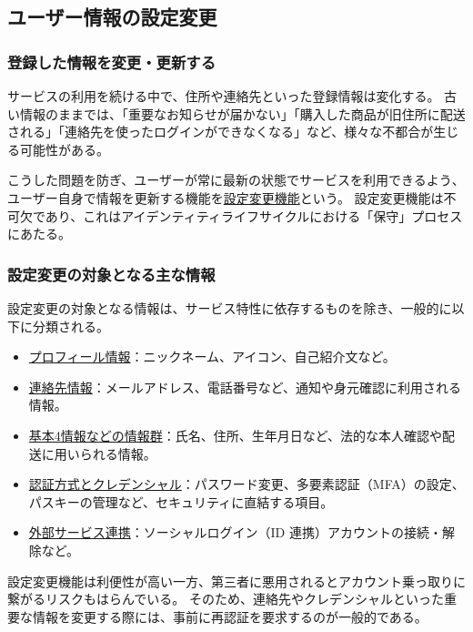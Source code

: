 \documentclass[uplatex]{jsarticle}
\def\label#1{}%
\begin{document}
\subsection{ユーザー情報の設定変更}

\subsubsection{登録した情報を変更・更新する}

サービスの利用を続ける中で、住所や連絡先といった登録情報は変化する。
古い情報のままでは、「重要なお知らせが届かない」「購入した商品が旧住所に配送される」「連絡先を使ったログインができなくなる」など、様々な不都合が生じる可能性がある。

\begin{dfn}[ユーザー情報の設定変更]\label{dfn:ch3-settings-change}
こうした問題を防ぎ、ユーザーが常に最新の状態でサービスを利用できるよう、ユーザー自身で情報を更新する機能を\underline{設定変更機能}という。
設定変更機能は不可欠であり、これはアイデンティティライフサイクルにおける「保守」プロセスにあたる。
\end{dfn}

\subsubsection{設定変更の対象となる主な情報}

設定変更の対象となる情報は、サービス特性に依存するものを除き、一般的に以下に分類される。
\begin{itemize}
\item \underline{プロフィール情報}：ニックネーム、アイコン、自己紹介文など。
\item \underline{連絡先情報}：メールアドレス、電話番号など、通知や身元確認に利用される情報。
\item \underline{基本4情報などの情報群}：氏名、住所、生年月日など、法的な本人確認や配送に用いられる情報。
\item \underline{認証方式とクレデンシャル}：パスワード変更、多要素認証（MFA）の設定、パスキーの管理など、セキュリティに直結する項目。
\item \underline{外部サービス連携}：ソーシャルログイン（ID 連携）アカウントの接続・解除など。
\end{itemize}

\begin{rem}[重要な情報の変更前の再認証]\label{rem:ch3-settings-reauth}
設定変更機能は利便性が高い一方、第三者に悪用されるとアカウント乗っ取りに繋がるリスクもはらんでいる。
そのため、連絡先やクレデンシャルといった重要な情報を変更する際には、事前に再認証を要求するのが一般的である。
\end{rem}
\end{document}
